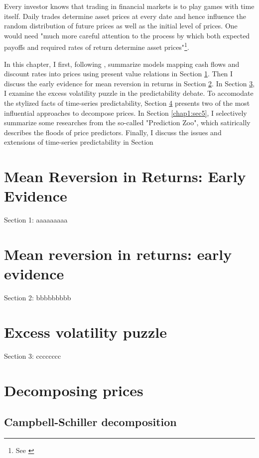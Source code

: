 \minitoc

\vspace{0.5cm}
Every investor knows that trading in financial markets is to play
games with time itself. Daily trades determine asset prices at every date and hence
influence the random distribution of future prices as well as the initial
level of prices. One would need "much more careful attention to the process
by which both expected payoffs and required rates of return determine
asset prices"\footnote{See \citet[p.~121]{campbell2017financial}}.

In this chapter, I first, following \citet[Chapter~5]{campbell2017financial}, summarize models 
mapping cash flows and discount rates into prices using present value relations in Section \ref{chap1:sec1}.
Then I discuss the early evidence for mean reversion in returns in Section \ref{chap1:sec2}.
In Section \ref{chap1:sec3}, I examine the excess volatility puzzle in the predictability debate.
To accomodate the stylized facts of time-series predictability, Section \ref{chap1:sec4}
presents two of the most influential approaches to decompose prices. In Section \ref{chap1:sec5},
I selectively summarize some researches from the so-called "Prediction Zoo", which satirically 
describes the floods of price predictors. Finally, I discuss the issues and extensions of time-series
predictability in Section


\section{Mean Reversion in Returns: Early Evidence}\label{chap1:sec1}
Section 1: aaaaaaaaa

\section{Mean reversion in returns: early evidence}\label{chap1:sec2}
Section 2: bbbbbbbbb

\section{Excess volatility puzzle}\label{chap1:sec3}
Section 3: cccccccc

\section{Decomposing prices}\label{chap1:sec4}
\subsection{Campbell-Schiller decomposition}\label{chap1:sec4:ssec1}
